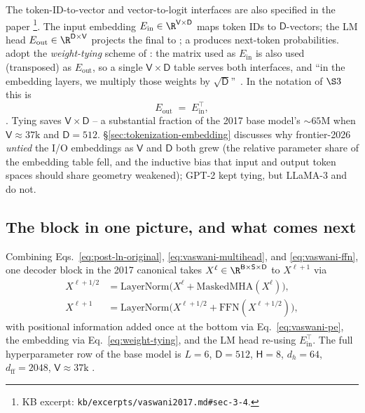 The token-ID-to-vector and vector-to-logit interfaces are also
specified in the paper%
\footnote{KB excerpt: \nolinkurl{kb/excerpts/vaswani2017.md#sec-3-4}.}.
The input embedding $E_{\text{in}} \in \R^{\mathsf{V} \times \mathsf{D}}$
maps token IDs to $\mathsf{D}$-vectors; the LM head
$E_{\text{out}} \in \R^{\mathsf{D} \times \mathsf{V}}$ projects the
final  to  ; a  produces
next-token probabilities. \citet{vaswani2017} adopt the
\emph{weight-tying} scheme of \citet{press2017-tied-embed}: the
matrix used as $E_{\text{in}}$ is also used (transposed) as
$E_{\text{out}}$, so a single $\mathsf{V} \times \mathsf{D}$ table
serves both interfaces, and ``in the embedding layers, we multiply
those weights by $\sqrt{\mathsf{D}}$''~\citep[\S 3.4]{vaswani2017}. In
the notation of $\S 3$ this is
\begin{equation}
  E_{\text{out}} \;=\; E_{\text{in}}^{\!\top},
  \tag{Press--Vaswani tying}
  \label{eq:weight-tying}
\end{equation}
\citep{press2017-tied-embed}. Tying saves $\mathsf{V} \times \mathsf{D}$
 -- a substantial fraction of the 2017 base model's $\sim 65$M
 when $\mathsf{V} \approx 37\text{k}$ and $\mathsf{D} = 512$.
\S\ref{sec:tokenization-embedding} discusses why frontier-2026
\emph{untied} the I/O embeddings as $\mathsf{V}$ and $\mathsf{D}$ both
grew (the relative parameter share of the embedding table fell, and
the inductive bias that input and output token spaces should share
geometry weakened); GPT-2 \citep[\S 2.3]{radford2019-gpt2} kept
tying, but LLaMA-3 and  do not.

\subsection{The block in one picture, and what comes next}
\label{sec:canonical-block-picture}

Combining Eqs.~\eqref{eq:post-ln-original}, \eqref{eq:vaswani-multihead},
and \eqref{eq:vaswani-ffn}, one decoder block in the 2017 canonical
takes  $X^\ell \in \R^{\mathsf{B} \times \mathsf{S} \times \mathsf{D}}$
to $X^{\ell+1}$ via
\begin{align}
  X^{\ell + 1/2} &= \mathrm{LayerNorm}\!\bigl(X^\ell + \mathrm{MaskedMHA}(X^\ell)\bigr),
  \\
  X^{\ell + 1}   &= \mathrm{LayerNorm}\!\bigl(X^{\ell + 1/2} + \mathrm{FFN}(X^{\ell + 1/2})\bigr),
\end{align}
with positional information added once at the bottom via
Eq.~\eqref{eq:vaswani-pe}, the embedding via
Eq.~\eqref{eq:weight-tying}, and the LM head re-using
$E_{\text{in}}^\top$. The full hyperparameter row of the base
model is $L = 6$, $\mathsf{D} = 512$, $\mathsf{H} = 8$,
$d_h = 64$, $d_{\text{ff}} = 2048$, $\mathsf{V} \approx 37\text{k}$
\citep[\S 3.1, \S 5.1]{vaswani2017}.

